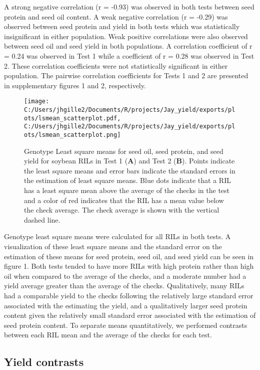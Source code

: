 \documentclass[Agronomy,article,submit,moreauthors,pdftex]{mdpi}
\begin{document}
A strong negative correlation (r = -0.93) was observed in both tests
between seed protein and seed oil content. A weak negative correlation
(r = -0.29) was observed between seed protein and yield in both tests
which was statistically insignificant in either population. Weak
positive correlations were also observed between seed oil and seed yield
in both populations. A correlation coefficient of r = 0.24 was observed
in Test 1 while a coefficient of r = 0.28 was observed in Test 2. These
correlation coefficients were not statistically significant in either
population. The pairwise correlation coefficients for Tests 1 and 2 are
presented in supplementary figures 1 and 2, respectively.

\begin{figure}[H]
\centering
\texttt{[image: C:/Users/jhgille2/Documents/R/projects/Jay\_yield/exports/plots/lsmean\_scatterplot.pdf, C:/Users/jhgille2/Documents/R/projects/Jay\_yield/exports/plots/lsmean\_scatterplot.png]}
\caption{Genotype Least square means for seed oil, seed protein, and seed yield for soybean RILs in Test 1 (\textbf{A}) and Test 2 (\textbf{B}). Points indicate the least square means and error bars indicate the standard errors in the estimation of least square means. Blue dots indicate that a RIL has a least square mean above the average of the checks in the test and a color of red indicates that the RIL has a mean value below the check average. The check average is shown with the vertical dashed line.}
\end{figure}

Genotype least square means were calculated for all RILs in both tests.
A visualization of these least square means and the standard error on
the estimation of these means for seed protein, seed oil, and seed yield
can be seen in figure 1. Both tests tended to have more RILs with high
protein rather than high oil when compared to the average of the checks,
and a moderate number had a yield average greater than the average of
the checks. Qualitatively, many RILs had a comparable yield to the
checks following the relatively large standard error associated with the
estimating the yield, and a qualitatively larger seed protein content
given the relatively small standard error associated with the estimation
of seed protein content. To separate means quantitatively, we performed
contrasts between each RIL mean and the average of the checks for each
test.

\hypertarget{yield-contrasts}{%
\subsection{Yield contrasts}\label{yield-contrasts}}
\end{document}
